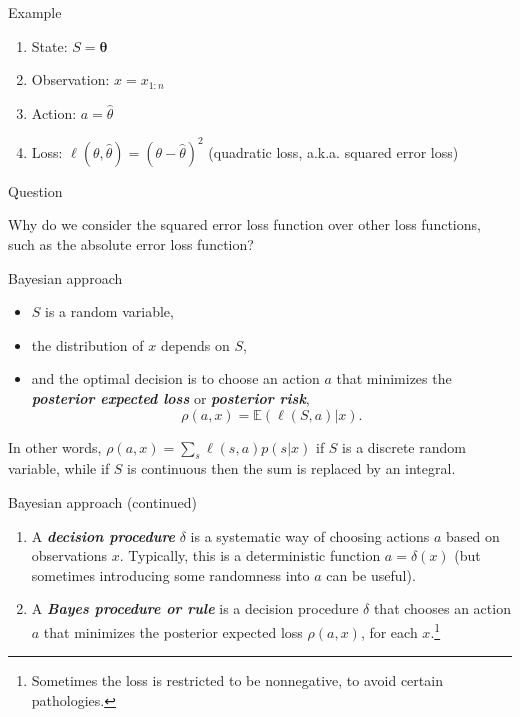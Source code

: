 \documentclass[
  ignorenonframetext,
]{beamer}
\providecommand{\tightlist}{%
  \setlength{\itemsep}{0pt}\setlength{\parskip}{0pt}}
\newcommand{\btheta}{{\bm\theta}}
\newcommand{\term}[1]{\textit{\textbf{#1}}}
\newcommand{\E}{\mathbb{E}}
\begin{document}
\begin{frame}{Example}
\protect\hypertarget{example}{}

\begin{enumerate}
\tightlist
\item
  State: \(S = \btheta\)
\item
  Observation: \(x = x_{1:n}\)
\item
  Action: \(a = \hat\theta\)
\item
  Loss: \(\ell(\theta,\hat\theta) = (\theta-\hat\theta)^2\) (quadratic
  loss, a.k.a. squared error loss)
\end{enumerate}

\end{frame}

\begin{frame}{Question}
\protect\hypertarget{question}{}

Why do we consider the squared error loss function over other loss
functions, such as the absolute error loss function?

\end{frame}

\begin{frame}{Bayesian approach}
\protect\hypertarget{bayesian-approach}{}

\begin{itemize}
\tightlist
\item
  \(S\) is a random variable,
\item
  the distribution of \(x\) depends on \(S\),
\item
  and the optimal decision is to choose an action \(a\) that minimizes
  the \term{posterior expected loss} or \term{posterior risk},
  \[\rho(a,x) =\E(\ell(S,a)|x).\]
\end{itemize}

In other words, \(\rho(a,x) =\sum_s \ell(s,a) p(s|x)\) if \(S\) is a
discrete random variable, while if \(S\) is continuous then the sum is
replaced by an integral.

\end{frame}

\begin{frame}{Bayesian approach (continued)}
\protect\hypertarget{bayesian-approach-continued}{}

\begin{enumerate}
\tightlist
\item
  A \term{decision procedure} \(\delta\) is a systematic way of choosing
  actions \(a\) based on observations \(x\). Typically, this is a
  deterministic function \(a=\delta(x)\) (but sometimes introducing some
  randomness into \(a\) can be useful).
\item
  A \term{Bayes procedure or rule} is a decision procedure \(\delta\)
  that chooses an action \(a\) that minimizes the posterior expected
  loss \(\rho(a,x)\), for each
  \(x\).\footnote{Sometimes the loss is restricted to be nonnegative, to avoid certain pathologies.}
\end{enumerate}

\end{frame}
\end{document}
